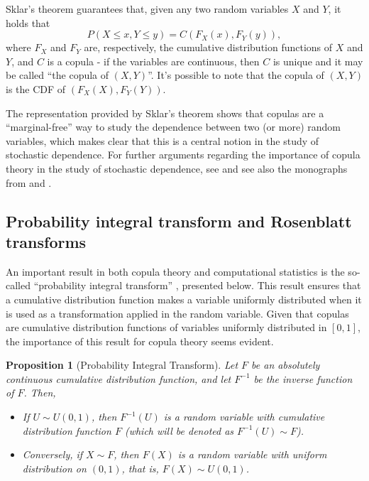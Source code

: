 \documentclass[
]{article}
\newtheorem{proposition}{Proposition}
\begin{document}
Sklar's theorem \citep{sklar1959, nelsen2006} guarantees that, given any
two random variables \(X\) and \(Y\), it holds that
\[P(X \leq x, Y \leq y) = C(F_X(x), F_Y(y)),\] where \(F_X\) and \(F_Y\)
are, respectively, the cumulative distribution functions of \(X\) and
\(Y\), and \(C\) is a copula - if the variables are continuous, then
\(C\) is unique and it may be called ``the copula of \((X,Y)\)''. It's
possible to note that the copula of \((X,Y)\) is the CDF of
\((F_X(X), F_Y(Y))\).

The representation provided by Sklar's theorem shows that copulas are a
``marginal-free'' way to study the dependence between two (or more)
random variables, which makes clear that this is a central notion in the
study of stochastic dependence. For further arguments regarding the
importance of copula theory in the study of stochastic dependence, see
\citet{embrechts2002} and see also the monographs from
\citet{nelsen2006} and \citet{joe2014}.

\subsection{Probability integral transform and Rosenblatt
transforms}\label{probability-integral-transform-and-rosenblatt-transforms}

An important result in both copula theory and computational statistics
is the so-called ``probability integral transform'' \citep{int-transf},
presented below. This result ensures that a cumulative distribution
function makes a variable uniformly distributed when it is used as a
transformation applied in the random variable. Given that copulas are
cumulative distribution functions of variables uniformly distributed in
\([0,1]\), the importance of this result for copula theory seems
evident.

\begin{proposition}[Probability Integral Transform]
Let $F$ be an absolutely continuous cumulative distribution function, and let $F^{-1}$ be the inverse function of $F$. Then,
\begin{itemize}
\item If $U \sim U(0,1)$, then $F^{-1}(U)$ is a random variable with cumulative distribution function $F$ (which will be denoted as $F^{-1}(U) \sim F$).
\item Conversely, if $X \sim F$, then $F(X)$ is a random variable with uniform distribution on $(0,1)$, that is, $F(X) \sim U(0,1)$.
\end{itemize}
\end{proposition}
\end{document}
